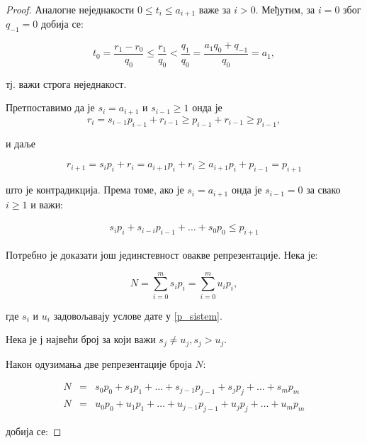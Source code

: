 \documentclass[a4paper]{article}
\begin{document}
\begin{proof}
	
	Аналогне неједнакости $ 0 \le t_{i} \le a_{i+1} $ важе за $ i > 0 $. Међутим, за $ i = 0 $ због $ q_{-1} = 0 $ добија се:
	
	\begin{displaymath} 
		t_0=\frac{r_1-r_0}{q_0}\le \frac{r_1}{q_0} < \frac{q_1}{q_0}=
		\frac{a_1 q_0+q_{-1}}{q_0}=a_1,
	\end{displaymath}
	
	тј. важи строга неједнакост.
	
	Претпоставимо да је $ s_{i} = a_{i+1} $ и $ s_{i-1} \geq 1 $ онда је 
	\begin{displaymath}
		r_{i} = s_{i-1}p_{i-1} + r_{i-1} \geq p_{i-1} + r_{i-1} \geq p_{i-1},
	\end{displaymath}
	
	и даље
	
	\begin{displaymath}
		r_{i+1} = s_{i}p_{i} + r_{i} = a_{i+1}p_{i} + r_{i} \geq a_{i+1}p_{i} + p_{i-1} = p_{i+1}
	\end{displaymath}
	
	што је контрадикција. Према томе, ако је $ s_{i} = a_{i+1} $ онда је $ s_{i-1} = 0 $ за свако $ i \ge 1 $ и важи:
	
	\begin{eqnarray}
		\label{nejednakost} s_{i}p_{i} + s_{i-i}p_{i-1} + \ldots + s_{0}p_{0} \le p_{i+1}
	\end{eqnarray}
	
	Потребно је доказати још јединстевност овакве репрезентације. Нека је: 
	
	\begin{displaymath}
		N = \sum_{i=0}^{m} s_{i}p_{i}  = \sum_{i=0}^{m} u_{i}p_{i},
	\end{displaymath}
	
	где $ s_{i} $ и $ u_{i} $ задовољавају услове дате у \ref{p_sistem}.
	
	Нека је $ ј $ највећи број за који важи $ s_{j} \neq u_{j}, s_{j} > u_{j} $. 
	
	Након одузимања две репрезентације броја $ N $:
	
	\begin{eqnarray*}
		N &=& s_{0}p_{0} + s_{1}p_{1} + \ldots + s_{j-1}p_{j-1} + s_{j}p_{j} + \ldots + s_{m}p_{m}\\		
		N &=& u_{0}p_{0} + u_{1}p_{1} + \ldots + u_{j-1}p_{j-1} + u_{j}p_{j} + \ldots + u_{m}p_{m}
	\end{eqnarray*}
	
	добија се:
	

\end{proof}
\end{document}
